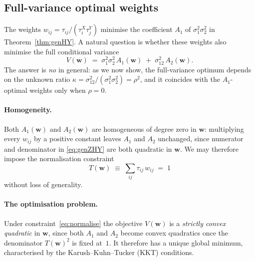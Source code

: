 %
%

\subsection{Full-variance optimal weights}\label{sec:fullopt}

The weights $w_{ij} = \tau_{ij}/(\tau_i^X\tau_j^Y)$ minimise the
coefficient $A_1$ of $\sigma_1^2\sigma_2^2$ in Theorem~\ref{thm:genHY}.
A natural question is whether these weights also minimise the full
conditional variance
\begin{equation}\label{eq:fullvar}
    V(\mathbf{w}) \;=\; \sigma_1^2\sigma_2^2\, A_1(\mathbf{w})
                      \;+\; \sigma_{12}^2\, A_2(\mathbf{w}).
\end{equation}
The answer is \emph{no} in general: as we now show, the
full-variance optimum depends on the unknown ratio
$\kappa = \sigma_{12}^2/(\sigma_1^2\sigma_2^2) = \rho^2$,
and it coincides with the $A_1$-optimal weights only when $\rho = 0$.

\paragraph{Homogeneity.}
Both $A_1(\mathbf{w})$ and $A_2(\mathbf{w})$ are homogeneous of
degree zero in $\mathbf{w}$: multiplying every $w_{ij}$ by a positive
constant leaves $A_1$ and $A_2$ unchanged, since numerator and
denominator in \eqref{eq:genZHY} are both quadratic in $\mathbf{w}$.
We may therefore impose the normalisation constraint
\begin{equation}\label{eq:normalise}
    T(\mathbf{w}) \;\equiv\; \sum_{ij} \tau_{ij}\, w_{ij} \;=\; 1
\end{equation}
without loss of generality.

\paragraph{The optimisation problem.}
Under constraint~\eqref{eq:normalise} the objective
$V(\mathbf{w})$ is a \emph{strictly convex quadratic} in
$\mathbf{w}$, since both $A_1$ and $A_2$ become convex quadratics
once the denominator $T(\mathbf{w})^2$ is fixed at~$1$.
It therefore has a unique global minimum, characterised
by the Karush--Kuhn--Tucker (KKT) conditions.

